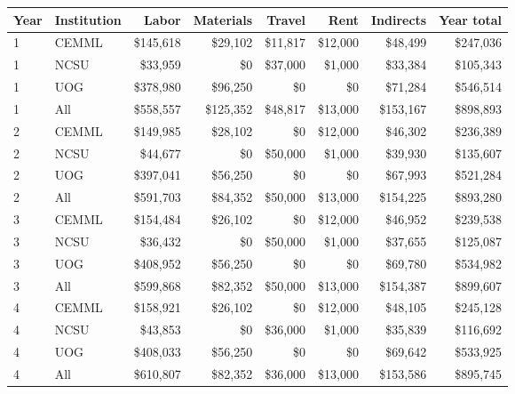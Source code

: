 
\begin{tabular}{llrrrrrr}
\toprule
Year & Institution & Labor & Materials & Travel & Rent & Indirects & Year total \\
\midrule
1 & CEMML & \$145,618 & \$29,102 & \$11,817 & \$12,000 & \$48,499 & \$247,036 \\ 
1 & NCSU & \$33,959 & \$0 & \$37,000 & \$1,000 & \$33,384 & \$105,343 \\ 
1 & UOG & \$378,980 & \$96,250 & \$0 & \$0 & \$71,284 & \$546,514 \\ 

    \midrule    
    1 & All & \$558,557 & \$125,352 & \$48,817 & \$13,000 & \$153,167 & \$898,893 \\ 

    \midrule
    2 & CEMML & \$149,985 & \$28,102 & \$0 & \$12,000 & \$46,302 & \$236,389 \\ 
2 & NCSU & \$44,677 & \$0 & \$50,000 & \$1,000 & \$39,930 & \$135,607 \\ 
2 & UOG & \$397,041 & \$56,250 & \$0 & \$0 & \$67,993 & \$521,284 \\ 

    \midrule    
    2 & All & \$591,703 & \$84,352 & \$50,000 & \$13,000 & \$154,225 & \$893,280 \\ 

    \midrule
    3 & CEMML & \$154,484 & \$26,102 & \$0 & \$12,000 & \$46,952 & \$239,538 \\ 
3 & NCSU & \$36,432 & \$0 & \$50,000 & \$1,000 & \$37,655 & \$125,087 \\ 
3 & UOG & \$408,952 & \$56,250 & \$0 & \$0 & \$69,780 & \$534,982 \\ 

    \midrule    
    3 & All & \$599,868 & \$82,352 & \$50,000 & \$13,000 & \$154,387 & \$899,607 \\ 

    \midrule
    4 & CEMML & \$158,921 & \$26,102 & \$0 & \$12,000 & \$48,105 & \$245,128 \\ 
4 & NCSU & \$43,853 & \$0 & \$36,000 & \$1,000 & \$35,839 & \$116,692 \\ 
4 & UOG & \$408,033 & \$56,250 & \$0 & \$0 & \$69,642 & \$533,925 \\ 

    \midrule    
    4 & All & \$610,807 & \$82,352 & \$36,000 & \$13,000 & \$153,586 & \$895,745 \\ 

    \midrule
    
\bottomrule
\end{tabular}

